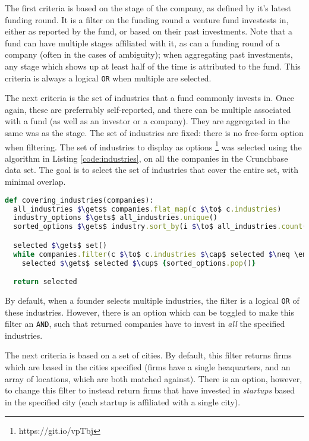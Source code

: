 The first criteria is based on the stage of the company, as defined by it's latest funding round. It is a filter on the funding round a venture fund investests in, either as reported by the fund, or based on their past investments. Note that a fund can have multiple stages affiliated with it, as can a funding round of a company (often in the cases of ambiguity); when aggregating past investments, any stage which shows up at least half of the time is attributed to the fund. This criteria is always a logical \texttt{OR} when multiple are selected.

The next criteria is the set of industries that a fund commonly invests in. Once again, these are preferrably self-reported, and there can be multiple associated with a fund (as well as an investor or a company). They are aggregated in the same was as the stage. The set of industries are fixed: there is no free-form option when filtering. The set of industries to display as options \footnote{https://git.io/vpTbj} was selected using the algorithm in Listing \ref{code:industries}, on all the companies in the Crunchbase data set. The goal is to select the set of industries that cover the entire set, with minimal overlap.

\begin{lstlisting}[float,frame=single,mathescape=true,language=Ruby,basicstyle=\footnotesize,columns=fullflexible,caption={Display Industries},label={code:industries}]
def covering_industries(companies):
  all_industries $\gets$ companies.flat_map(c $\to$ c.industries)
  industry_options $\gets$ all_industries.unique()
  sorted_options $\gets$ industry.sort_by(i $\to$ all_industries.count(i))

  selected $\gets$ set()
  while companies.filter(c $\to$ c.industries $\cap$ selected $\neq \emptyset$).count() > 0:
    selected $\gets$ selected $\cup$ {sorted_options.pop()}

  return selected
\end{lstlisting}

By default, when a founder selects multiple industries, the filter is a logical \texttt{OR} of these industries. However, there is an option which can be toggled to make this filter an \texttt{AND}, such that returned companies have to invest in \textit{all} the specified industries.

The next criteria is based on a set of cities. By default, this filter returns firms which are based in the cities specified (firms have a single heaquarters, and an array of locations, which are both matched against). There is an option, however, to change this filter to instead return firms that have invested in \textit{startups} based in the specified city (each startup is affiliated with a single city).

